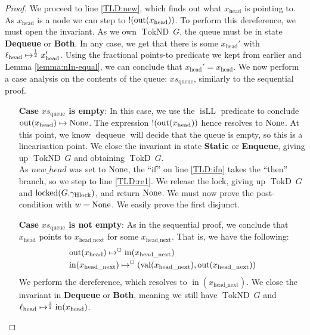 \documentclass[a4paper, 10pt]{report}
\theoremstyle{definition}
\newcommand{\locked}{\operatorname{locked}}
\newcommand{\dequeue}{\operatorname{dequeue}}
\newcommand{\xsqueue}{xs_{\mathrm{queue}}}
\newcommand{\isLL}{\operatorname{isLL}}
\newcommand{\locN}[1]{\loc_{\mathrm{#1}}}
\newcommand{\lochead}{\locN{head}}
\newcommand{\nodeval}{\valB}
\newcommand{\nIn}[1]{\operatorname{in}(#1)}
\newcommand{\nVal}[1]{\operatorname{val}(#1)}
\newcommand{\nOut}[1]{\operatorname{out}(#1)}
\newcommand{\node}{x}
\newcommand{\nodeN}[1]{\node_{\mathrm{#1}}}
\newcommand{\nodehead}{\nodeN{head}}
\newcommand{\nodeheadnext}{\nodeN{head\_next}}
\newcommand{\StaticState}{\textbf{Static}\xspace}
\newcommand{\EnqueueState}{\textbf{Enqueue}\xspace}
\newcommand{\DequeueState}{\textbf{Dequeue}\xspace}
\newcommand{\BothState}{\textbf{Both}\xspace}
\newcommand{\Qg}{G}
\newcommand{\ghlock}{\gname_{\mathrm{Hlock}}}
\newcommand{\TokD}[1]{\operatorname{TokD} ~ #1}
\newcommand{\TokDQg}{\TokD{\Qg}}
\newcommand{\TokND}[1]{\operatorname{TokND} ~ #1}
\newcommand{\TokNDQg}{\TokND{\Qg}}
\newcommand{\isNode}[1]{\nIn{#1} \mapsto^{\persistently} (\nVal{#1}, \nOut{#1})}
\begin{document}
\begin{proof}
We proceed to line \ref{TLD:new}, which finds out what $\nodehead$ is pointing to. As $\nodehead$ is a node we can step to $\deref (\nOut{\nodehead})$. To perform this dereference, we must open the invariant. As we own $\TokNDQg$, the queue must be in state \DequeueState or \BothState. In any case, we get that there is some $\nodehead'$ with $\lochead \mapsto^{\frac{1}{2}} \nodehead'$. Using the fractional points-to predicate we kept from earlier and Lemma \ref{lemma:nIn-equal}, we can conclude that $\nodehead' = \nodehead$. We now perform a case analysis on the contents of the queue: $\xsqueue$, similarly to the sequential proof.
\begin{itemize}
  \item[\textbf{Case}] \textbf{$\xsqueue$ is empty}:
  In this case, we use the $\isLL$ predicate to conclude $\nOut{\nodehead} \mapsto \None$. The expression $\deref (\nOut{\nodehead})$ hence resolves to $\operatorname{None}$. At this point, we know $\dequeue$ will decide that the queue is empty, so this is a linearisation point. We close the invariant in state \StaticState or \EnqueueState, giving up $\TokNDQg$ and obtaining $\TokDQg$.\\
  As $new\_head$ was set to $\operatorname{None}$, the ``if'' on line \ref{TLD:ifn} takes the ``then'' branch, so we step to line \ref{TLD:re1}. We release the lock, giving up $\TokDQg$ and $\locked(\Qg.\ghlock)$, and return $\operatorname{None}$. We must now prove the post-condition with $\nodeval = \None$. We easily prove the first disjunct.

  \item[\textbf{Case}] \textbf{$\xsqueue$ is not empty}:
  As in the sequential proof, we conclude that $\nodehead$ points to $\nodeheadnext$ for some $\nodeheadnext$. That is, we have the following:
  \begin{align}
    &\nOut{\nodehead} \mapsto^{\persistently} \nIn{\nodeheadnext}\label{TLMSQ:spec:conc:proof:deq:headtonext}\\
    &\isNode{\nodeheadnext}\label{TLMSQ:spec:conc:proof:deq:headnextnode}
  \end{align}
  We perform the dereference, which resolves to $\nIn{\nodeheadnext}$. We close the invariant in \DequeueState or \BothState, meaning we still have $\TokNDQg$ and $\lochead \mapsto^{\frac{1}{2}} \nIn{\nodehead}$.


\end{itemize}
\end{proof}
\end{document}
